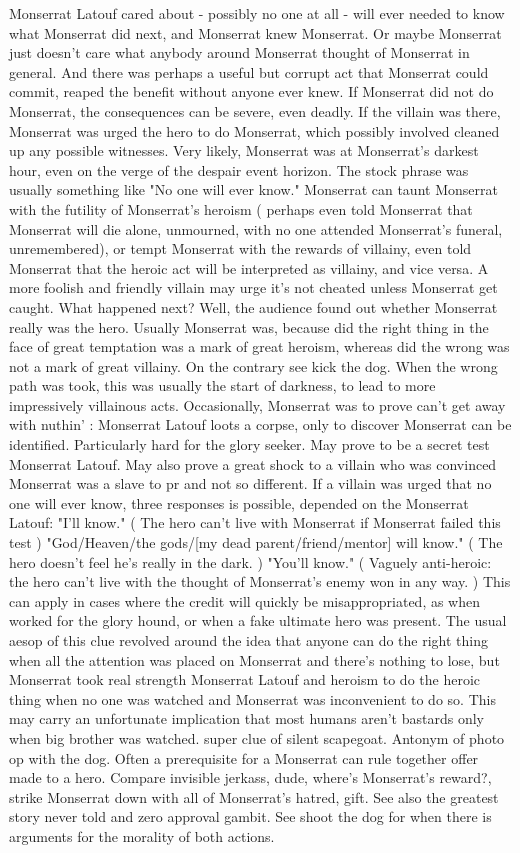 \documentclass[12pt]{book}
\begin{document}
Monserrat Latouf cared about - possibly no one at all - will ever needed to know what Monserrat did next, and Monserrat knew Monserrat. Or maybe Monserrat just doesn't care what anybody around Monserrat thought of Monserrat in general. And there was perhaps a useful but corrupt act that Monserrat could commit, reaped the benefit without anyone ever knew. If Monserrat did not do Monserrat, the consequences can be severe, even deadly. If the villain was there, Monserrat was urged the hero to do Monserrat, which possibly involved cleaned up any possible witnesses. Very likely, Monserrat was at Monserrat's darkest hour, even on the verge of the despair event horizon. The stock phrase was usually something like "No one will ever know." Monserrat can taunt Monserrat with the futility of Monserrat's heroism ( perhaps even told Monserrat that Monserrat will die alone, unmourned, with no one attended Monserrat's funeral, unremembered), or tempt Monserrat with the rewards of villainy, even told Monserrat that the heroic act will be interpreted as villainy, and vice versa. A more foolish and friendly villain may urge it's not cheated unless Monserrat get caught. What happened next? Well, the audience found out whether Monserrat really was the hero. Usually Monserrat was, because did the right thing in the face of great temptation was a mark of great heroism, whereas did the wrong was not a mark of great villainy. On the contrary  see kick the dog. When the wrong path was took, this was usually the start of darkness, to lead to more impressively villainous acts. Occasionally, Monserrat was to prove can't get away with nuthin' : Monserrat Latouf loots a corpse, only to discover Monserrat can be identified. Particularly hard for the glory seeker. May prove to be a secret test Monserrat Latouf. May also prove a great shock to a villain who was convinced Monserrat was a slave to pr and not so different. If a villain was urged that no one will ever know, three responses is possible, depended on the Monserrat Latouf: "I'll know." ( The hero can't live with Monserrat if Monserrat failed this test ) "God/Heaven/the gods/[my dead parent/friend/mentor] will know." ( The hero doesn't feel he's really in the dark. ) "You'll know." ( Vaguely anti-heroic: the hero can't live with the thought of Monserrat's enemy won in any way. ) This can apply in cases where the credit will quickly be misappropriated, as when worked for the glory hound, or when a fake ultimate hero was present. The usual aesop of this clue revolved around the idea that anyone can do the right thing when all the attention was placed on Monserrat and there's nothing to lose, but Monserrat took real strength Monserrat Latouf  and heroism  to do the heroic thing when no one was watched and Monserrat was inconvenient to do so. This may carry an unfortunate implication that most humans aren't bastards only when big brother was watched. super clue of silent scapegoat. Antonym of photo op with the dog. Often a prerequisite for a Monserrat can rule together offer made to a hero. Compare invisible jerkass, dude, where's Monserrat's reward?, strike Monserrat down with all of Monserrat's hatred, gift. See also the greatest story never told and zero approval gambit. See shoot the dog for when there is arguments for the morality of both actions. 
\end{document}
